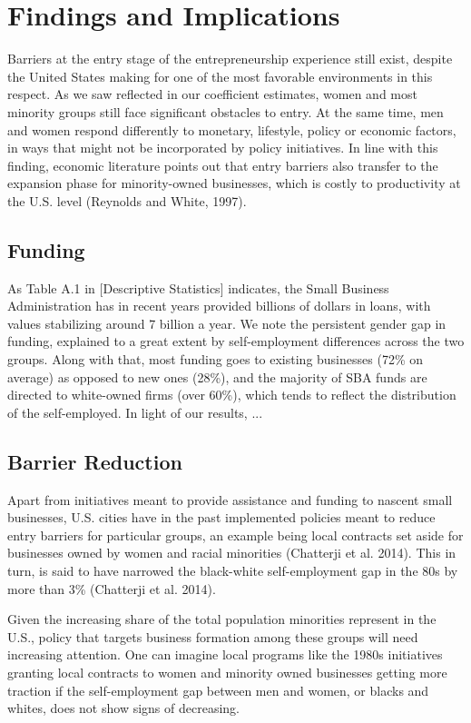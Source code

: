 \section{Findings and Implications}

Barriers at the entry stage of the entrepreneurship experience still exist, despite the United States making for one of the most favorable environments in this respect. As we saw reflected in our coefficient estimates, women and most minority groups still face significant obstacles to entry. At the same time, men and women respond differently to monetary, lifestyle, policy or economic factors, in ways that might not be incorporated by policy initiatives. In line with this finding, economic literature points out that entry barriers also transfer to the expansion phase for minority-owned businesses, which is costly to productivity at the U.S. level (Reynolds and White, 1997). 

\subsection{Funding}

As Table A.1 in [Descriptive Statistics] indicates, the Small Business Administration has in recent years provided billions of dollars in loans, with values stabilizing around 7 billion a year. We note the persistent gender gap in funding, explained to a great extent by self-employment differences across the two groups. Along with that, most funding goes to existing businesses (72\% on average) as opposed to new ones (28\%), and the majority of SBA funds are directed to white-owned firms (over 60\%), which tends to reflect the distribution of the self-employed. In light of our results, ... 

\subsection{Barrier Reduction}

Apart from initiatives meant to provide assistance and funding to nascent small businesses, U.S. cities have in the past implemented policies meant to reduce entry barriers for particular groups, an example being local contracts set aside for businesses owned by women and racial minorities (Chatterji et al. 2014). This in turn, is said to have narrowed the black-white self-employment gap in the 80s by more than 3\% (Chatterji et al. 2014).

Given the increasing share of the total population minorities represent in the U.S., policy that targets business formation among these groups will need increasing attention. One can imagine local programs like the 1980s initiatives granting local contracts to women and minority owned businesses getting more traction if the self-employment gap between men and women, or blacks and whites, does not show signs of decreasing.  

